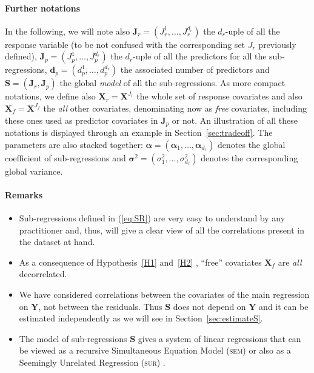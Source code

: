 \documentclass[11pt,a4paper]{article}
\begin{document}
\paragraph{Further notations} In the following, we will note also $\boldsymbol{J}_r=(J_{r}^1,\ldots,J_r^{d_r})$ the $d_r$-uple of all the response variable (to be not confused with the corresponding set $J_r$ previously defined), $\boldsymbol{J}_p=(J_{p}^1,\ldots,J_p^{d_r})$ the $d_r$-uple of all the predictors for all the sub-regressions, $\boldsymbol{d}_p=(d_p^1,\ldots,d_p^{d_{r}})$ the associated number of predictors and $\boldsymbol{S}=(\boldsymbol{J}_r,\boldsymbol{J}_p)$ the global {\it model} of all the sub-regressions. As more compact notations, we define also $\boldsymbol{X}_r=\boldsymbol{X}^{J_{r}}$ the whole set of response covariates and also $\boldsymbol{X}_f=\boldsymbol{X}^{J_{f}}$ the {\it all} other covariates, denominating now as {\it free} covariates, including these ones used as predictor covariates in $\boldsymbol{J}_p$ or not. An illustration of all these notations is displayed through an example in Section~\ref{sec:tradeoff}. The parameters are also stacked together: $\boldsymbol{\alpha}=(\boldsymbol{\alpha}_1,\ldots,\boldsymbol{\alpha}_{d_r})$ denotes the global coefficient of sub-regressions and $\boldsymbol{\sigma}^2=(\sigma^2_1,\ldots,\sigma^2_{d_r})$ denotes the corresponding global variance.

\paragraph{Remarks}
\begin{itemize}
\item Sub-regressions defined in (\ref{eq:SR}) are very easy to understand by any practitioner and, thus, will give a clear view of all the correlations present in the dataset at hand.
\item As a consequence of Hypothesis~\ref{H1} and~\ref{H2} , ``free'' covariates $\boldsymbol{X}_f$ are {\it all} decorrelated.
\item We have considered correlations between the covariates of the main regression on $\boldsymbol{Y}$, not between the residuals. Thus $\boldsymbol{S}$ does not depend on $\boldsymbol{Y}$ and it can be estimated independently as we will see in Section~\ref{sec:estimateS}.
\item The model of sub-regressions $\boldsymbol{S}$ gives a system of linear regressions that can be viewed as a recursive Simultaneous Equation Model (\textsc{sem})\cite{davidson1993estimation,TIMM} or also as a Seemingly Unrelated Regression (\textsc{sur}) \cite{SURzellner}. 
\end{itemize} 
\end{document}
